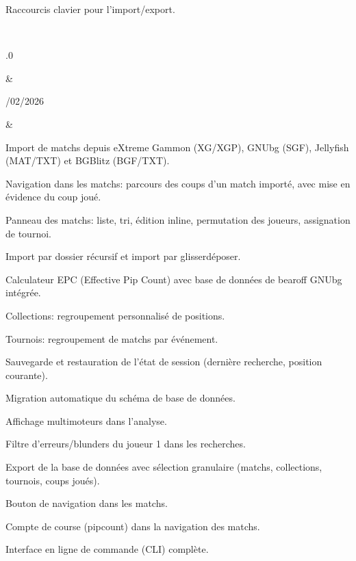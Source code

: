 \documentclass[letterpaper,10pt,french]{sphinxmanual}
\begin{document}
\begin{savenotes}
\begin{longtable}{}
\begin{varwidth}[t]{}
\sphinxAtStartPar
Raccourcis clavier pour l’import/export.
\sphinxbeforeendvarwidth
\end{varwidth}%
\\
\sphinxhline\begin{varwidth}[t]{}
.0
\sphinxbeforeendvarwidth
\end{varwidth}%
&\begin{varwidth}[t]{}
/02/2026
\sphinxbeforeendvarwidth
\end{varwidth}%
&\begin{varwidth}[t]{}
\sphinxAtStartPar
Import de matchs depuis eXtreme Gammon (XG/XGP), GNUbg (SGF), Jellyfish (MAT/TXT) et BGBlitz (BGF/TXT).

\sphinxAtStartPar
Navigation dans les matchs: parcours des coups d’un match importé, avec mise en évidence du coup joué.

\sphinxAtStartPar
Panneau des matchs: liste, tri, édition inline, permutation des joueurs, assignation de tournoi.

\sphinxAtStartPar
Import par dossier récursif et import par glisser\sphinxhyphen{}déposer.

\sphinxAtStartPar
Calculateur EPC (Effective Pip Count) avec base de données de bearoff GNUbg intégrée.

\sphinxAtStartPar
Collections: regroupement personnalisé de positions.

\sphinxAtStartPar
Tournois: regroupement de matchs par événement.

\sphinxAtStartPar
Sauvegarde et restauration de l’état de session (dernière recherche, position courante).

\sphinxAtStartPar
Migration automatique du schéma de base de données.

\sphinxAtStartPar
Affichage multi\sphinxhyphen{}moteurs dans l’analyse.

\sphinxAtStartPar
Filtre d’erreurs/blunders du joueur 1 dans les recherches.

\sphinxAtStartPar
Export de la base de données avec sélection granulaire (matchs, collections, tournois, coups joués).

\sphinxAtStartPar
Bouton de navigation dans les matchs.

\sphinxAtStartPar
Compte de course (pipcount) dans la navigation des matchs.

\sphinxAtStartPar
Interface en ligne de commande (CLI) complète.


\end{varwidth}
\end{longtable}
\end{savenotes}
\end{document}
